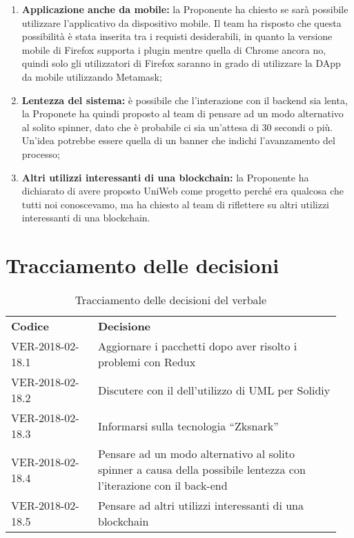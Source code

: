 \documentclass[VER-2018-01-09.tex]{subfiles}
\begin{document}
\begin{enumerate}
	\item \textbf{Applicazione anche da mobile:} la Proponente ha chiesto se sarà possibile utilizzare l'applicativo da dispositivo mobile. Il team ha risposto che questa possibilità è stata inserita tra i requisti desiderabili, in quanto la versione mobile di Firefox supporta i plugin mentre quella di Chrome ancora no, quindi solo gli utilizzatori di Firefox saranno in grado di utilizzare la DApp da mobile utilizzando Metamask;
	\item \textbf{Lentezza del sistema:} è possibile che l'interazione con il backend sia lenta, la Proponete ha quindi proposto al team di pensare ad un modo alternativo al solito spinner, dato che è probabile ci sia un'attesa di 30 secondi o più. Un'idea potrebbe essere quella di un banner che indichi l'avanzamento del processo;
	\item \textbf{Altri utilizzi interessanti di una blockchain:} la Proponente ha dichiarato di avere proposto UniWeb come progetto perché era qualcosa che tutti noi conoscevamo, ma ha chiesto al team di riflettere su altri utilizzi interessanti di una blockchain.
\end{enumerate}

\section{Tracciamento delle decisioni}
\begin{table}[H]
	\begin{center}
		\begin{tabu} to 
			\tableHeaderStyle
			\textbf{Codice} & \textbf{Decisione} \\
			VER-2018-02-18.1 & Aggiornare i pacchetti dopo aver risolto i problemi con Redux \\
			VER-2018-02-18.2 & Discutere con il \Vardanega dell'utilizzo di UML per Solidiy \\
			VER-2018-02-18.3 & Informarsi sulla tecnologia \textquotedblleft Zksnark\textquotedblright \\
			VER-2018-02-18.4 & Pensare ad un modo alternativo al solito spinner a causa della possibile lentezza con l'iterazione con il back-end \\
			VER-2018-02-18.5 & Pensare ad altri utilizzi interessanti di una blockchain \\
		\end{tabu}
	\caption{Tracciamento delle decisioni del verbale}
	\end{center}
\end{table}
\end{document}
